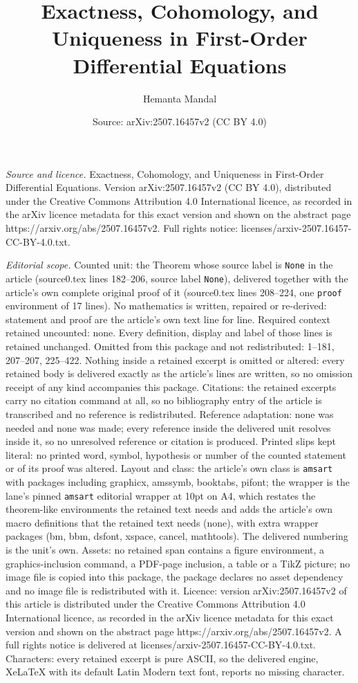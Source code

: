 \documentclass[10pt,a4paper]{amsart}
\title[Exactness, Cohomology, and Uniqueness in First-Order Differe]{Exactness, Cohomology, and Uniqueness in First-Order Differential Equations}
\author{Hemanta Mandal}
\date{Source: arXiv:2507.16457v2 (CC BY 4.0)}
\begin{document}
\maketitle

\noindent\emph{Source and licence.} Exactness, Cohomology, and Uniqueness in First-Order Differential Equations. Version arXiv:2507.16457v2 (CC BY 4.0), distributed under the Creative Commons Attribution 4.0 International licence, as recorded in the arXiv licence metadata for this exact version and shown on the abstract page https://arxiv.org/abs/2507.16457v2. Full rights notice: licenses/arxiv-2507.16457-CC-BY-4.0.txt.\par\smallskip

\noindent\textit{Editorial scope.} Counted unit: the Theorem whose source label is \texttt{None} in the article (source0.tex lines 182--206, source label \texttt{None}), delivered together with the article's own complete original proof of it (source0.tex lines 208--224, one \texttt{proof} environment of 17 lines). No mathematics is written, repaired or re-derived: statement and proof are the article's own text line for line. Required context retained uncounted: none. Every definition, display and label of those lines is retained unchanged. Omitted from this package and not redistributed: 1--181, 207--207, 225--422. Nothing inside a retained excerpt is omitted or altered: every retained body is delivered exactly as the article's lines are written, so no omission receipt of any kind accompanies this package. Citations: the retained excerpts carry no citation command at all, so no bibliography entry of the article is transcribed and no reference is redistributed. Reference adaptation: none was needed and none was made; every reference inside the delivered unit resolves inside it, so no unresolved reference or citation is produced. Printed slips kept literal: no printed word, symbol, hypothesis or number of the counted statement or of its proof was altered. Layout and class: the article's own class is \texttt{amsart} with packages including graphicx, amssymb, booktabs, pifont; the wrapper is the lane's pinned \texttt{amsart} editorial wrapper at 10pt on A4, which restates the theorem-like environments the retained text needs and adds the article's own macro definitions that the retained text needs (none), with extra wrapper packages (bm, bbm, dsfont, xspace, cancel, mathtools). The delivered numbering is the unit's own. Assets: no retained span contains a figure environment, a graphics-inclusion command, a PDF-page inclusion, a table or a TikZ picture; no image file is copied into this package, the package declares no asset dependency and no image file is redistributed with it. Licence: version arXiv:2507.16457v2 of this article is distributed under the Creative Commons Attribution 4.0 International licence, as recorded in the arXiv licence metadata for this exact version and shown on the abstract page https://arxiv.org/abs/2507.16457v2. A full rights notice is delivered at licenses/arxiv-2507.16457-CC-BY-4.0.txt. Characters: every retained excerpt is pure ASCII, so the delivered engine, XeLaTeX with its default Latin Modern text font, reports no missing character.
\end{document}
